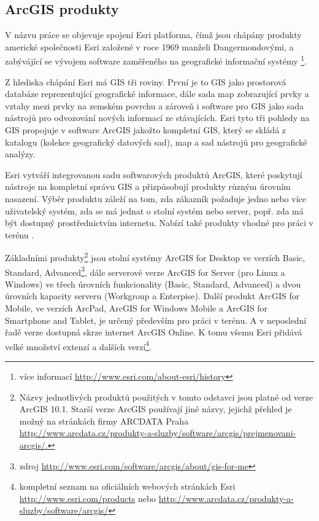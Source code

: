 
\subsection{ArcGIS produkty}

V názvu práce se objevuje spojení Esri platforma, čímž jsou chápány produkty americké společnosti Esri založené v roce 1969 manželi Dangermondovými, a zabývájící se vývojem software zaměřeného na geografické informační systémy \footnote{více informací \url{http://www.esri.com/about-esri/history}}.

Z hlediska chápání Esri má GIS tři roviny. První je to GIS jako prostorová databáze reprezentující geografické informace, dále sada map zobrazující prvky a vztahy mezi prvky na zemském povrchu a zároveň i software pro GIS jako sada nástrojů pro odvozování nových informací ze stávajících. Esri tyto tři pohledy na GIS propojuje v software ArcGIS jakožto kompletní GIS, který se skládá z katalogu (kolekce geografický datových sad), map a sad nástrojů pro geografické analýzy.

Esri vytváří integrovanou sadu softwarových produktů ArcGIS, které poskytují nástroje na kompletní správu GIS a přizpůsobují produkty různým úrovním nasazení. Výběr produktu záleží na tom, zda zákazník požaduje jedno nebo více uživatelský systém, zda se má jednat o stolní systém nebo server, popř. zda má být dostupný prostřednictvím internetu. Nabízí také produkty vhodné pro práci v terénu \citep{Esri2006}.

Základními produkty\footnote{Názvy jednotlivých produktů použitých v tomto odstavci jsou platné od verze ArcGIS 10.1. Starší verze ArcGIS používají jiné názvy, jejichž přehled je možný na stránkách firmy ARCDATA Praha \url{http://www.arcdata.cz/produkty-a-sluzby/software/arcgis/prejmenovani-arcgis/.}} jsou stolní systémy ArcGIS for Desktop ve verzích Basic, Standard, Advanced\footnote{zdroj \url{http://www.esri.com/software/arcgis/about/gis-for-me}}, dále serverové verze ArcGIS for Server (pro Linux a Windows) ve třech úrovních funkcionality (Basic, Standard, Advanced) a dvou úrovních kapacity serveru (Workgroup a Enterpise). Další produkt ArcGIS for Mobile, ve verzích ArcPad, ArcGIS for Windows Mobile a ArcGIS for Smartphone and Tablet, je určený především pro práci v terénu. A v neposlední řadě verze dostupná skrze internet ArcGIS Online. K tomu všemu Esri přidává velké množství extenzí a dalších verzí\footnote{kompletní seznam na oficiálních webových stránkách Esri \url{http://www.esri.com/products} nebo \url{http://www.arcdata.cz/produkty-a-sluzby/software/arcgis/}}.

